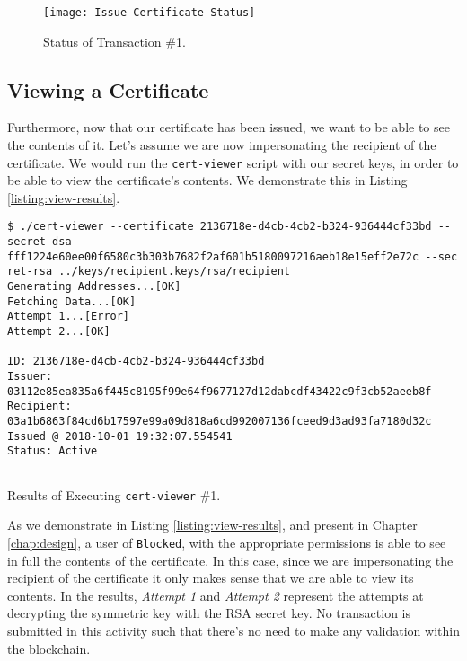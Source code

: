 \begin{figure}[htb]
	\centering
	\texttt{[image: Issue-Certificate-Status]}
	\caption{Status of Transaction \#1.}
	\label{fig:issue-certificate-status}
\end{figure}

\subsection{Viewing a Certificate}
\label{sec:impl-view}

Furthermore, now that our certificate has been issued, we want to be able to see the contents of it. Let's assume we are now impersonating the recipient of the certificate. We would run the \texttt{cert-viewer} script with our secret keys, in order to be  able to view the certificate's contents. We demonstrate this in Listing \ref{listing:view-results}.

\begin{listing}[ht]
	\begin{verbatim}
$ ./cert-viewer --certificate 2136718e-d4cb-4cb2-b324-936444cf33bd --secret-dsa fff1224e60ee00f6580c3b303b7682f2af601b5180097216aeb18e15eff2e72c --sec
ret-rsa ../keys/recipient.keys/rsa/recipient
Generating Addresses...[OK]
Fetching Data...[OK]
Attempt 1...[Error]
Attempt 2...[OK]

ID: 2136718e-d4cb-4cb2-b324-936444cf33bd
Issuer: 03112e85ea835a6f445c8195f99e64f9677127d12dabcdf43422c9f3cb52aeeb8f
Recipient: 03a1b6863f84cd6b17597e99a09d818a6cd992007136fceed9d3ad93fa7180d32c
Issued @ 2018-10-01 19:32:07.554541
Status: Active


\end{verbatim}
	\caption{Results of Executing \texttt{cert-viewer} \#1.}
	\label{listing:view-results}
\end{listing}

As we demonstrate in Listing \ref{listing:view-results}, and present in Chapter \ref{chap:design}, a user of \texttt{Blocked}, with the appropriate permissions is able to see in full the contents of the certificate. In this case, since we are impersonating the recipient of the certificate it only makes sense that we are able to view its contents. In the results, \emph{Attempt 1} and \emph{Attempt 2} represent the attempts at decrypting the symmetric key with the RSA secret key. No transaction is submitted in this activity such that there's no need to make any validation within the blockchain.

